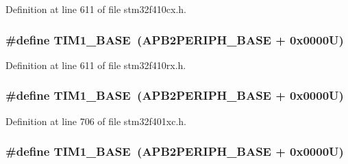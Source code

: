 Definition at line 611 of file stm32f410cx.\+h.

\subsubsection[{\texorpdfstring{T\+I\+M1\+\_\+\+B\+A\+SE}{TIM1_BASE}}]{\setlength{\rightskip}{0pt plus 5cm}\#define T\+I\+M1\+\_\+\+B\+A\+SE~({\bf A\+P\+B2\+P\+E\+R\+I\+P\+H\+\_\+\+B\+A\+SE} + 0x0000\+U)}\hypertarget{group___peripheral__registers__structures_gaf8aa324ca5011b8173ab16585ed7324a}{}\label{group___peripheral__registers__structures_gaf8aa324ca5011b8173ab16585ed7324a}


Definition at line 611 of file stm32f410rx.\+h.

\subsubsection[{\texorpdfstring{T\+I\+M1\+\_\+\+B\+A\+SE}{TIM1_BASE}}]{\setlength{\rightskip}{0pt plus 5cm}\#define T\+I\+M1\+\_\+\+B\+A\+SE~({\bf A\+P\+B2\+P\+E\+R\+I\+P\+H\+\_\+\+B\+A\+SE} + 0x0000\+U)}\hypertarget{group___peripheral__registers__structures_gaf8aa324ca5011b8173ab16585ed7324a}{}\label{group___peripheral__registers__structures_gaf8aa324ca5011b8173ab16585ed7324a}


Definition at line 706 of file stm32f401xc.\+h.

\subsubsection[{\texorpdfstring{T\+I\+M1\+\_\+\+B\+A\+SE}{TIM1_BASE}}]{\setlength{\rightskip}{0pt plus 5cm}\#define T\+I\+M1\+\_\+\+B\+A\+SE~({\bf A\+P\+B2\+P\+E\+R\+I\+P\+H\+\_\+\+B\+A\+SE} + 0x0000\+U)}\hypertarget{group___peripheral__registers__structures_gaf8aa324ca5011b8173ab16585ed7324a}{}\label{group___peripheral__registers__structures_gaf8aa324ca5011b8173ab16585ed7324a}


